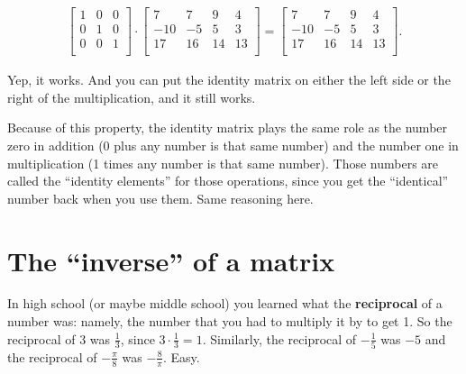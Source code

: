 \vspace{-.15in}
\begin{align*}
\begin{bmatrix}
1 & 0 & 0 \\
0 & 1 & 0 \\
0 & 0 & 1 \\
\end{bmatrix} \cdot
\begin{bmatrix}
7 & 7 & 9 & 4 \\
-10 & -5 & 5 & 3 \\
17 & 16 & 14 & 13 \\
\end{bmatrix} =
\begin{bmatrix}
7 & 7 & 9 & 4 \\
-10 & -5 & 5 & 3 \\
17 & 16 & 14 & 13 \\
\end{bmatrix}.
\end{align*}
\vspace{-.15in}

Yep, it works. And you can put the identity matrix on either the left side or
the right of the multiplication, and it still works.


Because of this property, the identity matrix plays the same role as the number
zero in addition (0 plus any number is that same number) and the number one in
multiplication (1 times any number is that same number). Those numbers are
called the ``identity elements'' for those operations, since you get the
``identical'' number back when you use them. Same reasoning here.

\section{The ``inverse'' of a matrix}

\label{matrixInverse}

In high school (or maybe middle school) you learned what the
\textbf{reciprocal} of a number was: namely, the number that you had to
multiply it by to get 1. So the reciprocal of $3$ was $\frac{1}{3}$, since $3
\cdot \frac{1}{3} = 1$. Similarly, the reciprocal of $-\frac{1}{5}$ was $-5$
and the reciprocal of $-\frac{\pi}{8}$ was $-\frac{8}{\pi}$. Easy.


